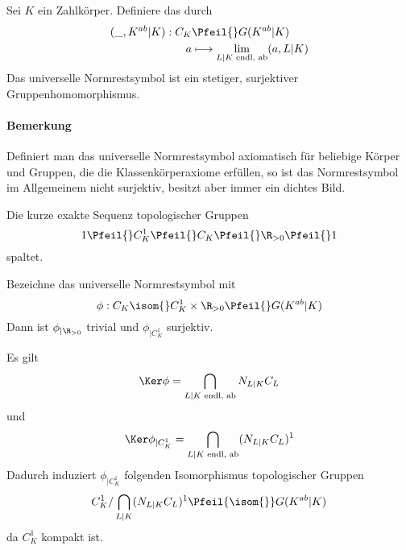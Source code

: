Sei $K$ ein Zahlkörper. Definiere das  durch
\begin{align*}
(\_, K^{ab} | K)  : C_K& \Pfeil{} G(K^{ab}|K) \\
a & \longmapsto  \lim\limits_{L|K \text{ endl, ab}}(a, L|K)
\end{align*}
Das universelle Normrestsymbol ist ein stetiger, surjektiver Gruppenhomomorphismus.
\paragraph{Bemerkung} Definiert man das universelle Normrestsymbol axiomatisch für beliebige Körper und Gruppen, die die Klassenkörperaxiome erfüllen, so ist das Normrestsymbol im Allgemeinem nicht surjektiv, besitzt aber immer ein dichtes Bild.

\Prop{}
Die kurze exakte Sequenz topologischer Gruppen
\[ 1 \Pfeil{} C_K^1 \Pfeil{} C_K \Pfeil{} \R_{> 0} \Pfeil{} 1 \]
spaltet.

\Lem{}
Bezeichne das universelle Normrestsymbol mit
\[ \phi : C_K \isom{} C_K^1 \times \R_{>0} \Pfeil{} G(K^{ab}|K) \]
Dann ist $\phi_{|\R_{>0}}$ trivial und $\phi_{|C_K^1}$ surjektiv.

\Bem{}
Es gilt
\[ \Ker \phi = \bigcap_{L|K \text{ endl, ab}}N_{L|K}C_L \]
und
\[ \Ker \phi_{|C_K^1} = \bigcap_{L|K \text{ endl, ab}}(N_{L|K}C_L)^1 \]
Dadurch induziert $\phi_{|C_K^1}$ folgenden Isomorphismus topologischer Gruppen
\[ C_K^1/\bigcap_{L|K}(N_{L|K}C_L)^1 \Pfeil{\isom{}} G(K^{ab}|K) \]
da $C_K^1$ kompakt ist.
